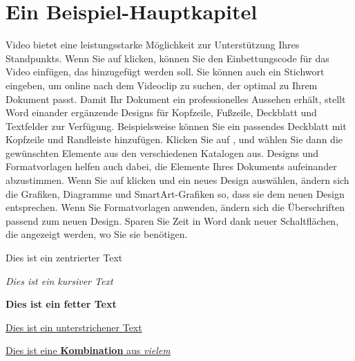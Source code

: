 \section{Ein Beispiel-Hauptkapitel}
\label{sec:Ein Beispiel-Hauptkapitel}
Video bietet eine leistungsstarke Möglichkeit zur Unterstützung Ihres Standpunkts. Wenn Sie auf  klicken, können Sie den Einbettungscode für das Video einfügen, das hinzugefügt werden soll. Sie können auch ein Stichwort eingeben, um online nach dem Videoclip zu suchen, der optimal zu Ihrem Dokument passt. Damit Ihr Dokument ein professionelles Aussehen erhält, stellt Word einander ergänzende Designs für \mbox{Kopfzeile}, Fußzeile, Deckblatt und Textfelder zur Verfügung. Beispielsweise können Sie ein passendes Deckblatt mit \mbox{Kopfzeile} und Randleiste hinzufügen. Klicken Sie auf , und wählen Sie dann die gewünschten Elemente aus den verschiedenen Katalogen aus. Designs und Formatvorlagen helfen auch dabei, die Elemente Ihres Dokuments aufeinander abzustimmen. Wenn Sie auf  klicken und ein neues Design auswählen, ändern sich die Grafiken, Diagramme und SmartArt-Grafiken so, dass sie dem neuen Design entsprechen. Wenn Sie Formatvorlagen anwenden, ändern sich die Überschriften passend zum neuen Design. Sparen Sie Zeit in Word dank neuer Schaltflächen, die angezeigt werden, wo Sie sie benötigen. 

\begin{center}
	Dies ist ein zentrierter Text
\end{center}

\textit{Dies ist ein kursiver Text}

\textbf{Dies ist ein fetter Text}

\underline{Dies ist ein unterstrichener Text}

\underline{Dies ist eine \textbf{Kombination} aus \textit{vielem}}

